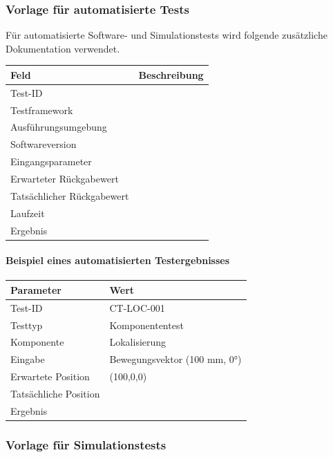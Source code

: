 \documentclass[
  a4paper,
  12pt,
  DIV=12,        %
  parskip=half,  %
  headings=small %
]{scrartcl}
\theoremstyle{definition}
\theoremstyle{definition}
\begin{document}
\subsubsection{Vorlage für automatisierte
Tests}\label{vorlage-fuxfcr-automatisierte-tests}

Für automatisierte Software- und Simulationstests wird folgende
zusätzliche Dokumentation verwendet.

\begin{longtable}[]{@{}ll@{}}
\toprule\noalign{}
Feld & Beschreibung \\
\midrule\noalign{}
\endhead
\bottomrule\noalign{}
\endlastfoot
Test-ID & \\
Testframework & \\
Ausführungsumgebung & \\
Softwareversion & \\
Eingangsparameter & \\
Erwarteter Rückgabewert & \\
Tatsächlicher Rückgabewert & \\
Laufzeit & \\
Ergebnis & \\
\end{longtable}

\paragraph{Beispiel eines automatisierten
Testergebnisses}\label{beispiel-eines-automatisierten-testergebnisses}

\begin{longtable}[]{@{}ll@{}}
\toprule\noalign{}
Parameter & Wert \\
\midrule\noalign{}
\endhead
\bottomrule\noalign{}
\endlastfoot
Test-ID & CT-LOC-001 \\
Testtyp & Komponententest \\
Komponente & Lokalisierung \\
Eingabe & Bewegungsvektor (100 mm, 0°) \\
Erwartete Position & (100,0,0) \\
Tatsächliche Position & \\
Ergebnis & \\
\end{longtable}

\subsubsection{Vorlage für
Simulationstests}\label{vorlage-fuxfcr-simulationstests}
\end{document}
